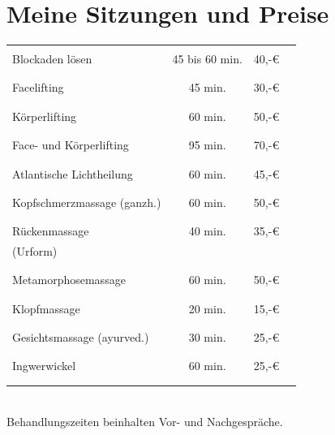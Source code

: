 \documentclass[10pt,foldmark,notumble]{leaflet}
\begin{document}
\section{Meine Sitzungen und Preise}
\begin{tabular}{p{35mm}ccr}%
\\
\hline
\\
Blockaden lösen   &45 bis 60 min. & 40,-€   \\
\\
\hline
\\
Facelifting  & 45 min. &  30,-€ \\
\\
\hline
\\
Körperlifting   & 60 min. &  50,-€ \\
\\
\hline
\\
Face- und Körperlifting   & 95 min. & 70,-€   \\
\\
\hline 
\\
Atlantische Lichtheilung  & 60 min. &  45,-€ \\
\\
\hline
\\
Kopfschmerzmassage (ganzh.) & 60 min. &  50,-€ \\
\\
\hline
\\
Rückenmassage  & 40 min. & 35,-€ \\
(Urform) & & \\
\\
\hline
\\
Metamorphosemassage & 60 min. & 50,-€ \\
\\
\hline
\\
Klopfmassage & 20 min. & 15,-€ \\
\\
\hline
\\
Gesichtsmassage (ayurved.) & 30 min. & 25,-€    \\
\\
\hline
\\
Ingwerwickel & 60 min. &  25,-€    \\
\\
\hline
\\
\end{tabular}
\\
Behandlungszeiten beinhalten Vor- und Nachgespräche.
\end{document}
